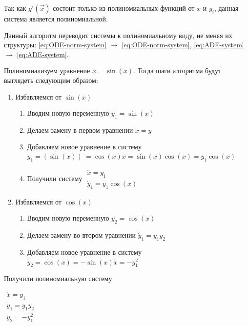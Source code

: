Так как $g'(\vec x)$ состоит только из полиномиальных функций от $x$ и $y_i$, данная система является полиномиальной.

Данный алгоритм переводит системы к полиномиальному виду, не меняя их структуры: \eqref{eq:ODE-norm-system} $\longrightarrow$ \eqref{eq:ODE-norm-system}, \eqref{eq:ADE-system} $\longrightarrow$ \eqref{eq:ADE-system}.

\begin{example}
    Полиномиализуем уравнение $\dot x = \sin(x)$. Тогда шаги алгоритма будут выглядеть следующим образом:
    \begin{enumerate}
        \item Избавляемся от $\sin(x)$
        \begin{enumerate}
            \item Вводим новую переменную $y_1 =  \sin(x)$
            \item Делаем замену в первом уравнении $\dot x = y$
            \item Добавляем новое уравнение в систему $\dot y_1 = ({\sin}(x))^{\cdot} = \cos(x) \dot x = \sin(x) \cos(x) = y_1 \cos(x)$
            \item Получили систему $\begin{array}{lcl} \dot x = y_1\\ \dot y_1 = y_1 \cos(x) \end{array}$
        \end{enumerate}
        \item Избавляемся от $\cos(x)$
        \begin{enumerate}
            \item Вводим новую переменную $y_2 =  \cos(x)$
            \item Делаем замену во втором уравнении $\dot y_1 = y_1 y_2$
            \item Добавляем новое уравнение в систему $\dot y_2 = \dot {\cos}(x) = -\sin(x) \dot x = -y_1^2$
        \end{enumerate}
    \end{enumerate}
    
    Получили полиномиальную систему
    
    $\begin{array}{lcl}
        \dot x = y_1\\
        \dot y_1 = y_1 y_2\\
        \dot y_2 = -y_1^2
    \end{array}$
\end{example}



